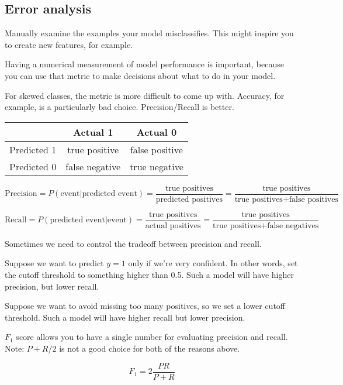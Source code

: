 \subsection{Error analysis}

Manually examine the examples your model misclassifies.
This might inspire you to create new features, for example.

Having a numerical measurement of model performance is important,
because you can use that metric to make decisions about what to do in your model.

For skewed classes, the metric is more difficult to come up with.
Accuracy, for example, is a particularly bad choice.
Precision/Recall is better.

\begin{center}
\begin{tabular}{c|c|c|}
    & Actual 1 & Actual 0 \\ \hline
    Predicted 1 & true positive & false positive \\ \hline
    Predicted 0 & false negative & true negative \\ \hline
\end{tabular}
\end{center}

\[
    \text{Precision} = 
    P(\text{event} | \text{predicted event}) = 
    \frac{\text{true positives}}{\text{predicted positives}} = 
    \frac{\text{true positives}}{\text{true positives} + \text{false positives}}
\]

\[
    \text{Recall} = 
    P(\text{predicted event} | \text{event}) =
    \frac{\text{true positives}}{\text{actual positives}} =
    \frac{\text{true positives}}{\text{true positives} + \text{false negatives}}
\]

Sometimes we need to control the tradeoff between precision and recall.

Suppose we want to predict $y=1$ only if we're very confident.
In other words, set the cutoff threshold to something higher than 0.5.
Such a model will have higher precision, but lower recall.

Suppose we want to avoid missing too many positives, so we set a lower cutoff threshold.
Such a model will have higher recall but lower precision.

$F_1$ score allows you to have a single number for evaluating precision and recall.
Note: $P+R/2$ is not a good choice for both of the reasons above.

\[ F_1 = 2\frac{PR}{P+R} \]

